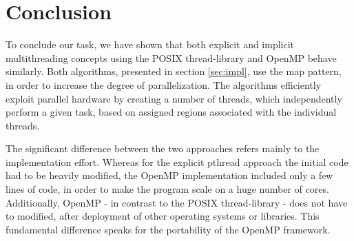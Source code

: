 \documentclass[conference]{IEEEtran}
\begin{document}





\section{Conclusion} 
\label{sec:conclusion}

To conclude our task, we have shown that both explicit and implicit multithreading concepts using the POSIX thread-library and OpenMP behave similarly. Both algorithms, presented in section \ref{sec:impl}, use the map pattern, in order to increase the degree of parallelization. The algorithms efficiently exploit parallel hardware by creating a number of threads, which independently perform a given task, based on assigned regions associated with the individual threads. 

The significant difference between the two approaches refers mainly to the implementation effort. Whereas for the explicit pthread approach the initial code had to be heavily modified, the OpenMP implementation included only a few lines of code, in order to make the program scale on a huge number of cores. Additionally, OpenMP - in contrast to the POSIX thread-library - does not have to modified, after deployment of other operating systems or libraries. This fundamental difference speaks for the portability of the OpenMP framework.




% 
% 





\end{document}
